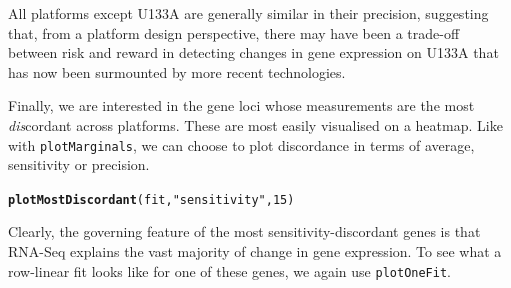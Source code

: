 \documentclass{article}\usepackage[]{graphicx}\usepackage[]{color}
\makeatletter
\newcommand{\hlnum}[1]{\textcolor[rgb]{0.686,0.059,0.569}{#1}}%
\newcommand{\hlstr}[1]{\textcolor[rgb]{0.192,0.494,0.8}{#1}}%
\newcommand{\hlstd}[1]{\textcolor[rgb]{0.345,0.345,0.345}{#1}}%
\newcommand{\hlkwd}[1]{\textcolor[rgb]{0.737,0.353,0.396}{\textbf{#1}}}%
\newenvironment{kframe}{%
 \def\at@end@of@kframe{}%
 \ifinner\ifhmode%
  \def\at@end@of@kframe{\end{minipage}}%
  \begin{minipage}{\columnwidth}%
 \fi\fi%
 \def\FrameCommand##1{\hskip\@totalleftmargin \hskip-\fboxsep
 \colorbox{shadecolor}{##1}\hskip-\fboxsep
     \hskip-\linewidth \hskip-\@totalleftmargin \hskip\columnwidth}%
 \MakeFramed {\advance\hsize-\width
   \@totalleftmargin\z@ \linewidth\hsize
   \@setminipage}}%
 {\par\unskip\endMakeFramed%
 \at@end@of@kframe}
\newenvironment{knitrout}{}{} %
\makeatother
\begin{document}
All platforms except U133A are generally similar in their precision, suggesting that, from a platform design perspective, there may have been a trade-off between risk and reward in detecting changes in gene expression on U133A that has now been surmounted by more recent technologies.

Finally, we are interested in the gene loci whose measurements are the most \emph{dis}cordant across platforms. These are most easily visualised on a heatmap. Like with \texttt{plotMarginals}, we can choose to plot discordance in terms of average, sensitivity or precision.

\begin{knitrout}
\color{fgcolor}\begin{kframe}
\begin{alltt}
\hlkwd{plotMostDiscordant}\hlstd{(fit,} \hlstr{"sensitivity"}\hlstd{,} \hlnum{15}\hlstd{)}
\end{alltt}


{\ttfamily\noindent\bfseries{}}\end{kframe}
\end{knitrout}

Clearly, the governing feature of the most sensitivity-discordant genes is that RNA-Seq explains the vast majority of change in gene expression. To see what a row-linear fit looks like for one of these genes, we again use \texttt{plotOneFit}. 
\end{document}
